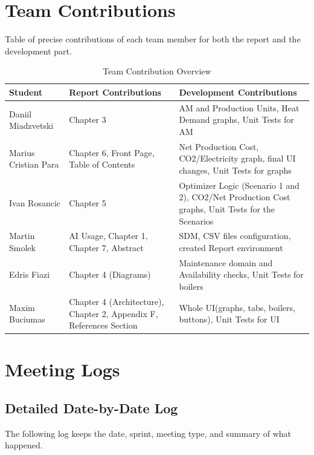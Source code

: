 ﻿
\chapter{Team Contributions}
Table of precise contributions of each team member for both the report
and the development part.

\begin{table}[H]
    \centering
    \begin{tabular}{lp{5cm}p{5cm}}
        \toprule
        \textbf{Student} & \textbf{Report Contributions} &
        \textbf{Development Contributions} \\
        \midrule
        Daniil Miadzvetski & Chapter 3 & AM and Production Units, Heat Demand graphs, Unit Tests for AM \\
        Marius Cristian Para & Chapter 6, Front Page, Table of Contents & Net Production Cost, CO2/Electricity graph, final UI changes, Unit Tests for graphs \\
        Ivan Rosancic & Chapter 5 & Optimizer Logic (Scenario 1 and 2), CO2/Net Production Cost graphs, Unit Tests for the Scenarios \\
        Martin Smolek & AI Usage, Chapter 1, Chapter 7, Abstract & SDM, CSV files configuration, created Report environment\\
        Edris Fiazi & Chapter 4 (Diagrams) & Maintenance domain and Availability checks, Unit Tests for boilers\\
        Maxim Buciumas & Chapter 4 (Architecture), Chapter 2, Appendix F, References Section & Whole UI(graphs, tabs, boilers, buttons), Unit Tests for UI\\
        \bottomrule
    \end{tabular}
    \caption{Team Contribution Overview}
    \label{tab:contributions}
\end{table}

\chapter{Meeting Logs}

\section*{Detailed Date-by-Date Log}
The following log keeps the date, sprint, meeting type, and summary of what happened.

